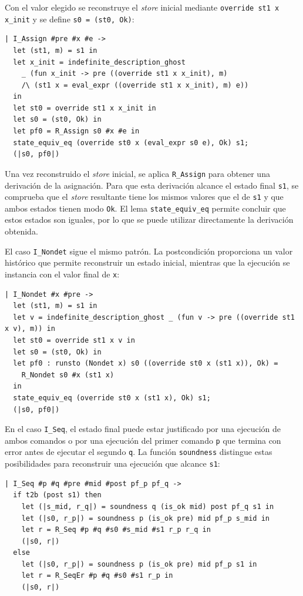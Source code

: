 \documentclass[a4paper,	11pt]{report}
\begin{document}
Con el valor elegido se reconstruye el \emph{store} inicial
mediante \lstinline|override st1 x x_init| y se define \lstinline|s0 = (st0, Ok)|:

\begin{lstlisting}
| I_Assign #pre #x #e ->
  let (st1, m) = s1 in
  let x_init = indefinite_description_ghost 
    _ (fun x_init -> pre ((override st1 x x_init), m) 
    /\ (st1 x = eval_expr ((override st1 x x_init), m) e))
  in
  let st0 = override st1 x x_init in
  let s0 = (st0, Ok) in
  let pf0 = R_Assign s0 #x #e in
  state_equiv_eq (override st0 x (eval_expr s0 e), Ok) s1;
  (|s0, pf0|)
\end{lstlisting}

Una vez reconstruido el \emph{store} inicial,
se aplica \lstinline|R_Assign| para obtener una derivación de la asignación.
Para que esta derivación alcance el estado final \lstinline|s1|,
se comprueba que el \emph{store} resultante tiene los mismos valores que el de \lstinline|s1| y que ambos estados tienen modo \lstinline|Ok|.
El lema \lstinline|state_equiv_eq| permite concluir que estos estados son iguales,
por lo que se puede utilizar directamente la derivación obtenida.

El caso \lstinline|I_Nondet| sigue el mismo patrón.
La postcondición proporciona un valor histórico que permite reconstruir un estado inicial,
mientras que la ejecución se instancia con el valor final de \lstinline|x|:

\begin{lstlisting}
| I_Nondet #x #pre ->
  let (st1, m) = s1 in
  let v = indefinite_description_ghost _ (fun v -> pre ((override st1 x v), m)) in
  let st0 = override st1 x v in
  let s0 = (st0, Ok) in
  let pf0 : runsto (Nondet x) s0 ((override st0 x (st1 x)), Ok) =
    R_Nondet s0 #x (st1 x)
  in
  state_equiv_eq (override st0 x (st1 x), Ok) s1;
  (|s0, pf0|)
\end{lstlisting}

En el caso \lstinline|I_Seq|,
el estado final puede estar justificado por una ejecución de ambos comandos o por una ejecución del primer comando \lstinline|p|
que termina con error antes de ejecutar el segundo \lstinline|q|.
La función \lstinline|soundness| distingue estas posibilidades para reconstruir una ejecución que alcance \lstinline|s1|:

\begin{lstlisting}
| I_Seq #p #q #pre #mid #post pf_p pf_q ->
  if t2b (post s1) then
    let (|s_mid, r_q|) = soundness q (is_ok mid) post pf_q s1 in
    let (|s0, r_p|) = soundness p (is_ok pre) mid pf_p s_mid in
    let r = R_Seq #p #q #s0 #s_mid #s1 r_p r_q in
    (|s0, r|)
  else
    let (|s0, r_p|) = soundness p (is_ok pre) mid pf_p s1 in
    let r = R_SeqEr #p #q #s0 #s1 r_p in
    (|s0, r|)
\end{lstlisting}
\end{document}
